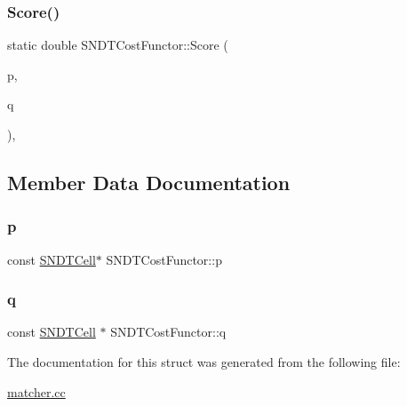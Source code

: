 \mbox{\label{structSNDTCostFunctor_a24876e79d893ae4a8fc098f85c615c6b}} 
\subsubsection{\texorpdfstring{Score()}{Score()}}
{\footnotesize\ttfamily static double S\+N\+D\+T\+Cost\+Functor\+::\+Score (\begin{DoxyParamCaption}\item[{const \hyperlink{classSNDTCell}{S\+N\+D\+T\+Cell} $\ast$}]{p,  }\item[{const \hyperlink{classSNDTCell}{S\+N\+D\+T\+Cell} $\ast$}]{q }\end{DoxyParamCaption})\hspace{0.3cm}{\ttfamily [inline]}, {\ttfamily [static]}}



\subsection{Member Data Documentation}
\mbox{\label{structSNDTCostFunctor_ac9abfd289124b6b30105e89266c062a0}} 
\subsubsection{\texorpdfstring{p}{p}}
{\footnotesize\ttfamily const \hyperlink{classSNDTCell}{S\+N\+D\+T\+Cell}$\ast$ S\+N\+D\+T\+Cost\+Functor\+::p}

\mbox{\label{structSNDTCostFunctor_a2e02683aa3af214e6d8bb7ca40b9f0b3}} 
\subsubsection{\texorpdfstring{q}{q}}
{\footnotesize\ttfamily const \hyperlink{classSNDTCell}{S\+N\+D\+T\+Cell} $\ast$ S\+N\+D\+T\+Cost\+Functor\+::q}



The documentation for this struct was generated from the following file\+:\begin{DoxyCompactItemize}
\item 
\hyperlink{matcher_8cc}{matcher.\+cc}\end{DoxyCompactItemize}
